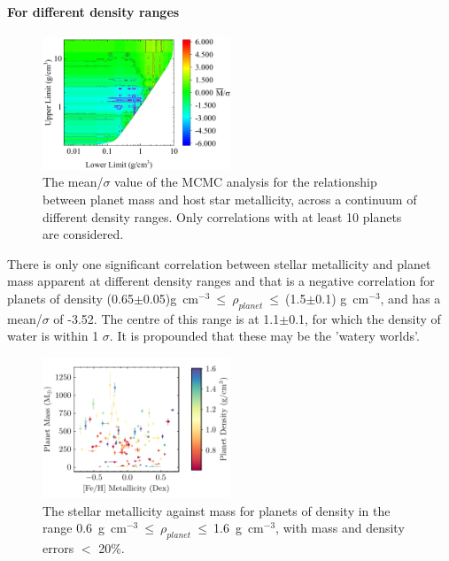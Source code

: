 \documentclass[a4paper,twocolumn,12pt]{article}
\begin{document}
\paragraph{For different density ranges}
\begin{figure}[h!]
    \centering
    \includegraphics[width=0.5\textwidth]{Graphs/FeH vs Mass correlations - Density ranges.pdf}
    \caption{The mean/$\sigma$ value of the MCMC analysis for the relationship between planet mass and host star metallicity, across a continuum of different density ranges. Only correlations with at least 10 planets are considered.}
    \label{figure: Fe/H vs Mass correlations - Density ranges}
\end{figure}

There is only one significant correlation between stellar metallicity and planet mass apparent at different density ranges and that is a negative correlation for planets of density (0.65$\pm$0.05)g~cm$^{-3}~\leq~\rho_{planet}~\leq~$(1.5$\pm$0.1) g~cm$^{-3}$, and has a mean/$\sigma$ of -3.52. The centre of this range is at 1.1$\pm$0.1, for which the density of water is within 1 $\sigma$. It is propounded that these may be the 'watery worlds'.

\begin{figure}[h!]
    \centering
    \includegraphics[width=0.5\textwidth]{Graphs/FeH vs Mass Planet Plot Density 0.6 to 1.6.pdf}
    \caption{The stellar metallicity against mass for planets of density in the range 0.6~g~cm$^{-3}~\leq~\rho_{planet}~\leq~$1.6~g~cm$^{-3}$, with mass and density errors $<$ 20\%.}
    \label{figure: Fe/H vs Mass correlations - Density ranges}
\end{figure}
\end{document}
